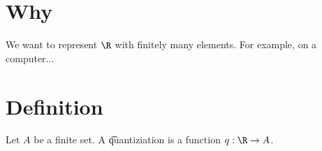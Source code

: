 
\section*{Why}

We want to represent $\R $ with finitely many elements. For example, on a computer...

\section*{Definition}

Let $A$ be a finite set.
A \t{quantiziation} is a function $q: \R  \to A$.

\blankpage